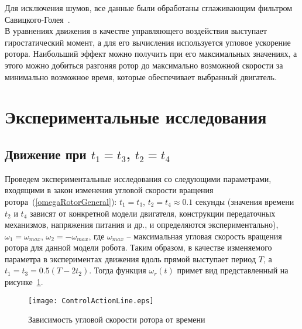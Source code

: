 Для исключения шумов, все данные были обработаны сглаживающим фильтром Савицкого-Голея~\cite{SGolay}.\\

В уравнениях движения в качестве управляющего воздействия выступает гиростатический момент, а для его вычисления используется угловое ускорение ротора. Наибольший эффект можно получить при его максимальных значениях, а этого можно добиться разгоняя ротор до максимально возможной скорости за минимально возможное время, которые обеспечивает выбранный двигатель.

\section{Экспериментальные исследования}

\subsection{Движение при $ t_1 = t_3 $, $ t_2 = t_4 $}

Проведем экспериментальные исследования со следующими параметрами, входящими в закон изменения угловой скорости вращения ротора~(\ref{omegaRotorGeneral}): $t_1=t_3$, $ t_2 = t_4 \approx 0.1 $ секунды (значения времени $ t_2$ и $ t_4 $ зависят от конкретной модели двигателя, конструкции передаточных механизмов, напряжения питания и др., и определяются экспериментально), $ \omega_1 = \omega_{max} $, $ \omega_2 = -\omega_{max} $, где $ \omega_{max} $ -- максимальная угловая скорость вращения ротора для данной модели робота. Таким образом, в качестве изменяемого параметра в экспериментах движения вдоль прямой выступает период $ T $, а $t_1=t_3 = 0.5(T - 2t_2)$. Тогда функция $ \omega_r(t) $ примет вид представленный на рисунке~\ref{ControlActionLine}.


\begin{figure}[!ht]
	\centering
	\texttt{[image: ControlActionLine.eps]}
	\caption{Зависимость угловой скорости ротора от времени}
	\label{ControlActionLine}
\end{figure}

%	
%	
%	
%	
%	

